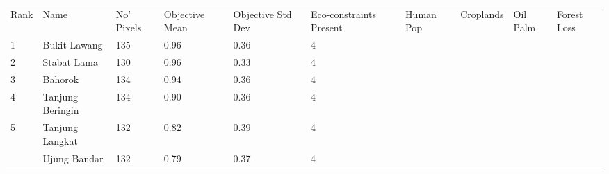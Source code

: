 \begin{table}[ht]
\centering
\begingroup\fontsize{9pt}{10pt}\selectfont
\begin{tabular}{C{0.05\textwidth}C{0.15\textwidth}C{0.08\textwidth}C{0.08\textwidth}C{0.08\textwidth}C{0.08\textwidth}C{0.08\textwidth}C{0.08\textwidth}C{0.08\textwidth}C{0.08\textwidth}}
 Rank & Name & No' Pixels & Objective Mean & Objective Std Dev & Eco-constraints  Present & Human Pop & Croplands & Oil Palm & Forest Loss \\ 
 {1} & Bukit Lawang & 135 & \textcolor[HTML]{FFFFFF}{0.96} & \textcolor[HTML]{000000}{0.36} & \textcolor[HTML]{000000}{4} &  &  &  &  \\ 
  {2} & Stabat Lama & 130 & \textcolor[HTML]{FFFFFF}{0.96} & \textcolor[HTML]{000000}{0.33} & \textcolor[HTML]{000000}{4} &  &  &  &  \\ 
  {3} & Bahorok & 134 & \textcolor[HTML]{FFFFFF}{0.94} & \textcolor[HTML]{000000}{0.36} & \textcolor[HTML]{000000}{4} &  &  &  &  \\ 
  {4} & Tanjung Beringin & 134 & \textcolor[HTML]{FFFFFF}{0.90} & \textcolor[HTML]{000000}{0.36} & \textcolor[HTML]{000000}{4} &  &  &  &  \\ 
  {5} & Tanjung Langkat & 132 & \textcolor[HTML]{FFFFFF}{0.82} & \textcolor[HTML]{000000}{0.39} & \textcolor[HTML]{000000}{4} &  &  &  &  \\ 
   & Ujung Bandar & 132 & \textcolor[HTML]{FFFFFF}{0.79} & \textcolor[HTML]{000000}{0.37} & \textcolor[HTML]{000000}{4} &  &  &  &  \\ 

\end{tabular}
\end{table}
